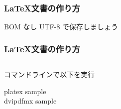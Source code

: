 \documentclass[aspectratio=149,10pt,t,]{beamer}
\begin{document}
\begin{frame}[fragile]
	\frametitle{\LaTeX 文書の作り方}
	
	
	BOM なし UTF-8 で保存しましょう
\end{frame}

\begin{frame}
	\frametitle{\LaTeX 文書の作り方}
	\begin{columns}[c]
		\begin{column}{0.5\textwidth}
			コマンドラインで以下を実行
			
			\begin{typecmdbox}
				platex sample\\
				dvipdfmx sample
			\end{typecmdbox}
		\end{column}
		\begin{column}{0.4\textwidth}
		\end{column}
	\end{columns}
\end{frame}
\end{document}
